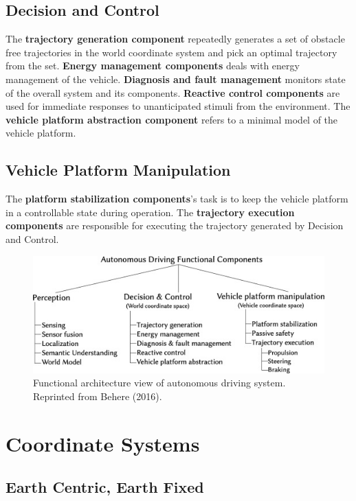 \subsection{Decision and Control}
The \textbf{trajectory generation component} repeatedly generates a set of obstacle free trajectories in the world coordinate system and pick an optimal trajectory from the set.  \textbf{Energy management components} deals with energy management of the vehicle. \textbf{Diagnosis and fault management} monitors state of the overall system and its components. \textbf{Reactive control components} are used for immediate responses to unanticipated stimuli from the environment. The \textbf{vehicle platform abstraction component} refers to a minimal model of the vehicle platform. 

\subsection{Vehicle Platform Manipulation}

The \textbf{platform stabilization components}'s task is to keep the vehicle platform in a controllable state during operation. The \textbf{trajectory execution components} are responsible for executing the trajectory generated by Decision and Control. 

\begin{figure}
	\centering
	\includegraphics[width=5in]{figures/fav_autonomous_driving}
	\caption[FAV of Antonomous Driving System.]{\small 
		Functional architecture view of autonomous driving system. Reprinted from Behere (2016). }
	\label{fig:fav_automonous}
\end{figure}

\section{Coordinate Systems}
	
\subsection{Earth Centric, Earth Fixed}

